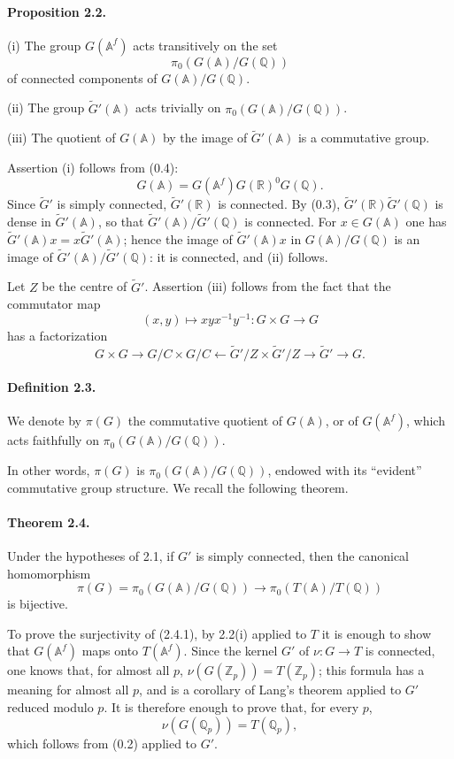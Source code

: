 \documentclass[10pt]{article}
\newcommand{\A}{\mathbb A}
\newcommand{\Af}{\mathbb A^f}
\newcommand{\Q}{\mathbb Q}
\newcommand{\R}{\mathbb R}
\newcommand{\Z}{\mathbb Z}
\begin{document}
\paragraph{Proposition 2.2.} (i) The group $G(\Af)$ acts transitively on the set
\[
\pi_0(G(\A)/G(\Q))
\]
of connected components of $G(\A)/G(\Q)$.

(ii) The group $\widetilde G'(\A)$ acts trivially on $\pi_0(G(\A)/G(\Q))$.

(iii) The quotient of $G(\A)$ by the image of $\widetilde G'(\A)$ is a commutative group.

Assertion (i) follows from (0.4):
\[
G(\A)=G(\Af)G(\R)^0G(\Q).
\]
Since $\widetilde G'$ is simply connected, $\widetilde G'(\R)$ is connected. By (0.3), $\widetilde G'(\R)\widetilde G'(\Q)$ is dense in $\widetilde G'(\A)$, so that $\widetilde G'(\A)/\widetilde G'(\Q)$ is connected. For $x\in G(\A)$ one has $\widetilde G'(\A)x=x\widetilde G'(\A)$; hence the image of $\widetilde G'(\A)x$ in $G(\A)/G(\Q)$ is an image of $\widetilde G'(\A)/\widetilde G'(\Q)$: it is connected, and (ii) follows.

Let $Z$ be the centre of $\widetilde G'$. Assertion (iii) follows from the fact that the commutator map
\[
(x,y)\longmapsto xyx^{-1}y^{-1}:G\times G\longrightarrow G
\]
has a factorization
\[
G\times G\longrightarrow G/C\times G/C\longleftarrow \widetilde G'/Z\times \widetilde G'/Z\longrightarrow \widetilde G'\longrightarrow G.
\]

\paragraph{Definition 2.3.} We denote by $\pi(G)$ the commutative quotient of $G(\A)$, or of $G(\Af)$, which acts faithfully on $\pi_0(G(\A)/G(\Q))$.

In other words, $\pi(G)$ is $\pi_0(G(\A)/G(\Q))$, endowed with its ``evident'' commutative group structure. We recall the following theorem.

\paragraph{Theorem 2.4.} Under the hypotheses of 2.1, if $G'$ is simply connected, then the canonical homomorphism
\[
\pi(G)=\pi_0(G(\A)/G(\Q))\longrightarrow \pi_0(T(\A)/T(\Q)) \tag{2.4.1}
\]
is bijective.

To prove the surjectivity of (2.4.1), by 2.2(i) applied to $T$ it is enough to show that $G(\Af)$ maps onto $T(\Af)$. Since the kernel $G'$ of $\nu:G\to T$ is connected, one knows that, for almost all $p$, $\nu(G(\Z_p))=T(\Z_p)$; this formula has a meaning for almost all $p$, and is a corollary of Lang's theorem applied to $G'$ reduced modulo $p$. It is therefore enough to prove that, for every $p$,
\[
\nu(G(\Q_p))=T(\Q_p),
\]
which follows from (0.2) applied to $G'$.
\end{document}
